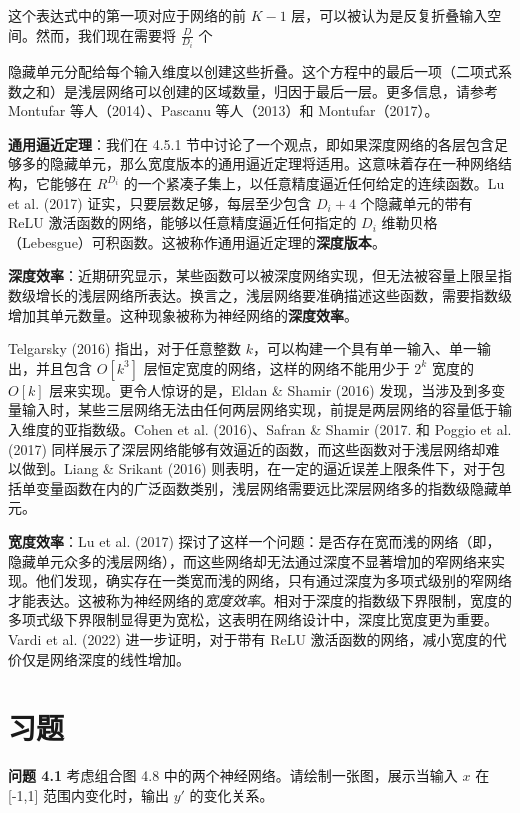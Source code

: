 \documentclass[lang=cn,newtx,10pt,scheme=chinese]{elegantbook}
\begin{document}
这个表达式中的第一项对应于网络的前 \(K - 1\) 层，可以被认为是反复折叠输入空间。然而，我们现在需要将 \(\frac{D}{D_i}\) 个

隐藏单元分配给每个输入维度以创建这些折叠。这个方程中的最后一项（二项式系数之和）是浅层网络可以创建的区域数量，归因于最后一层。更多信息，请参考 Montufar 等人（2014）、Pascanu 等人（2013）和 Montufar（2017）。

\textbf{通用逼近定理}：我们在 4.5.1 节中讨论了一个观点，即如果深度网络的各层包含足够多的隐藏单元，那么宽度版本的通用逼近定理将适用。这意味着存在一种网络结构，它能够在 \(R^{D_i}\) 的一个紧凑子集上，以任意精度逼近任何给定的连续函数。Lu et al. (2017) 证实，只要层数足够，每层至少包含 \(D_i + 4\) 个隐藏单元的带有 ReLU 激活函数的网络，能够以任意精度逼近任何指定的 \(D_i\) 维勒贝格（Lebesgue）可积函数。这被称作通用逼近定理的\textbf{深度版本}。

\textbf{深度效率}：近期研究显示，某些函数可以被深度网络实现，但无法被容量上限呈指数级增长的浅层网络所表达。换言之，浅层网络要准确描述这些函数，需要指数级增加其单元数量。这种现象被称为神经网络的\textbf{深度效率}。

Telgarsky (2016) 指出，对于任意整数 \(k\)，可以构建一个具有单一输入、单一输出，并且包含 \(O[k^3]\) 层恒定宽度的网络，这样的网络不能用少于 \(2^k\) 宽度的 \(O[k]\) 层来实现。更令人惊讶的是，Eldan \& Shamir (2016) 发现，当涉及到多变量输入时，某些三层网络无法由任何两层网络实现，前提是两层网络的容量低于输入维度的亚指数级。Cohen et al. (2016)、Safran \& Shamir (2017. 和 Poggio et al. (2017) 同样展示了深层网络能够有效逼近的函数，而这些函数对于浅层网络却难以做到。Liang \& Srikant (2016) 则表明，在一定的逼近误差上限条件下，对于包括单变量函数在内的广泛函数类别，浅层网络需要远比深层网络多的指数级隐藏单元。

\textbf{宽度效率}：Lu et al. (2017) 探讨了这样一个问题：是否存在宽而浅的网络（即，隐藏单元众多的浅层网络），而这些网络却无法通过深度不显著增加的窄网络来实现。他们发现，确实存在一类宽而浅的网络，只有通过深度为多项式级别的窄网络才能表达。这被称为神经网络的\textit{宽度效率}。相对于深度的指数级下界限制，宽度的多项式级下界限制显得更为宽松，这表明在网络设计中，深度比宽度更为重要。Vardi et al. (2022) 进一步证明，对于带有 ReLU 激活函数的网络，减小宽度的代价仅是网络深度的线性增加。

\section{习题}

\textbf{问题 4.1} 考虑组合图 4.8 中的两个神经网络。请绘制一张图，展示当输入 \(x\) 在 [-1,1] 范围内变化时，输出 \(y'\) 的变化关系。
\end{document}
